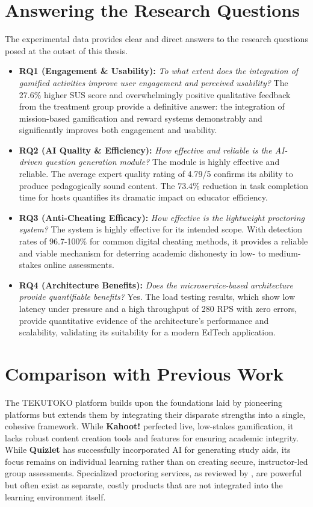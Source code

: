\section{Answering the Research Questions}
\label{sec:discussion-questions}
The experimental data provides clear and direct answers to the research questions posed at the outset of this thesis.

\begin{itemize}
    \item \textbf{RQ1 (Engagement \& Usability):} \textit{To what extent does the integration of gamified activities improve user engagement and perceived usability?} The 27.6\% higher SUS score and overwhelmingly positive qualitative feedback from the treatment group provide a definitive answer: the integration of mission-based gamification and reward systems demonstrably and significantly improves both engagement and usability.

    \item \textbf{RQ2 (AI Quality \& Efficiency):} \textit{How effective and reliable is the AI-driven question generation module?} The module is highly effective and reliable. The average expert quality rating of 4.79/5 confirms its ability to produce pedagogically sound content. The 73.4\% reduction in task completion time for hosts quantifies its dramatic impact on educator efficiency.

    \item \textbf{RQ3 (Anti-Cheating Efficacy):} \textit{How effective is the lightweight proctoring system?} The system is highly effective for its intended scope. With detection rates of 96.7-100\% for common digital cheating methods, it provides a reliable and viable mechanism for deterring academic dishonesty in low- to medium-stakes online assessments.

    \item \textbf{RQ4 (Architecture Benefits):} \textit{Does the microservice-based architecture provide quantifiable benefits?} Yes. The load testing results, which show low latency under pressure and a high throughput of 280 RPS with zero errors, provide quantitative evidence of the architecture's performance and scalability, validating its suitability for a modern EdTech application.
\end{itemize}

\section{Comparison with Previous Work}
\label{sec:discussion-comparison}
The TEKUTOKO platform builds upon the foundations laid by pioneering platforms but extends them by integrating their disparate strengths into a single, cohesive framework. While \textbf{Kahoot!} perfected live, low-stakes gamification, it lacks robust content creation tools and features for ensuring academic integrity. While \textbf{Quizlet} has successfully incorporated AI for generating study aids, its focus remains on individual learning rather than on creating secure, instructor-led group assessments. Specialized proctoring services, as reviewed by \citet{ullah2021}, are powerful but often exist as separate, costly products that are not integrated into the learning environment itself.

